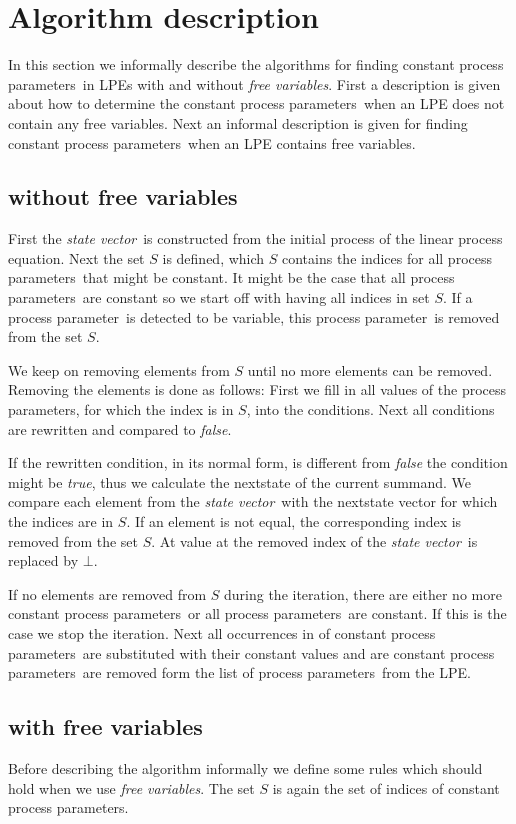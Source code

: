 \index{}\documentclass[a4paper,10pt]{article}
\theoremstyle{plain}
\theoremstyle{definition}
\newcommand{\lpe}{linear process equation}
\newcommand{\ovr}{\overrightarrow}
\newcommand{\pp}{process parameter}
\newcommand{\pps}{process parameters}
\newcommand{\ti}{\textit}
\newcommand{\sv}{\textit{state vector}}
\begin{document}


\section{Algorithm description}
In this section we informally describe the algorithms for finding constant \pps\ in LPEs with and without \ti{free variables}. First a description is given about how to determine the constant \pps\ when an LPE does not contain any free variables. Next an informal description is given for finding constant \pps\ when an LPE contains free variables.

\subsection{without free variables}\label{alg:org}

First the \sv\ is constructed from the initial process of the \lpe. Next the set $S$ is defined, which $S$ contains the indices for all \pps\ that might be constant. It might be the case that all \pps\ are constant so we start off with having all indices in set $S$. If a \pp\ is detected to be variable, this \pp\ is removed from the set $S$.

We keep on removing elements from $S$ until no more elements can be removed. Removing the elements is done as follows:
First we fill in all values of the \pps , for which the index is in $S$, into the conditions. Next all conditions are rewritten and compared to \ti{false}.

If the rewritten condition, in its normal form, is different from \ti{false} the condition might be \ti{true}, thus we calculate the nextstate of the current summand.  We compare each element from the \sv\ with the nextstate vector for which the indices are in $S$. If an element is not equal, the corresponding index is removed from the set $S$. 
At value at the removed index of the \sv\ is replaced by $\bot$. 

If no elements are removed from $S$ during the iteration, there are either no more constant \pps\ or all \pps\ are constant. If this is the case we stop the iteration. Next all occurrences in of constant \pps\ are substituted with their constant values and are constant \pps\ are removed form the list of \pps\ from the LPE. 

\subsection{with free variables}
Before describing the algorithm informally we define some rules which should hold when we use \ti{free variables}. The set  $S$ is again the set of indices of constant \pps .
\end{document}
